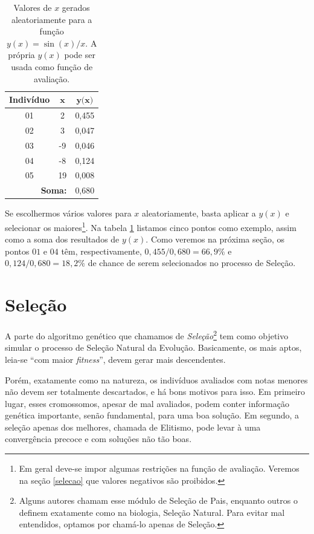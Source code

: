 	
	\begin{table}[htp]		
		\caption{\label{tabSen}Valores de $x$ gerados aleatoriamente para a função $y(x) = \sin(x)/x$. A própria $y(x)$ pode ser usada como função de avaliação.}
		\begin{center}
			\begin{tabular}{ccc}
				\hline
				\textbf{Indivíduo}& $\textbf{x}$		& $\textbf{y(x)}$ \\
				\hline
				01 & 	2							& 0,455 \\
				02 & 	3							& 0,047 \\
				03 &	-9						& 0,046\\	
				04 &	-8							& 0,124 \\
				05 &	19							& 	0,008 \\
				\hline
				\multicolumn{2}{r}{\textbf{Soma:}} & 0,680 \\
				\hline
			\end{tabular}
		\end{center}
	\end{table}
	
	
	Se escolhermos vários valores para $x$ aleatoriamente, basta aplicar a $y(x)$ e selecionar os maiores\footnote{Em geral deve-se impor algumas restrições na função de avaliação. Veremos na seção \ref{selecao} que valores negativos são proibidos.}. Na tabela \ref{tabSen} listamos cinco pontos como exemplo, assim como a soma dos resultados de $y(x)$. Como veremos na próxima seção, os pontos $01$ e $04$ têm, respectivamente, $0,455/0,680 = 66,9\%$ e $ 0,124/0,680 = 18,2\%$ de chance de serem selecionados no processo de Seleção.
	
	\section{\label{selecao}Seleção}
	
	A parte do algoritmo genético que chamamos de \textit{Seleção}\footnote{Alguns autores chamam esse módulo de Seleção de Pais, enquanto outros o definem exatamente como na biologia, Seleção Natural. Para evitar mal entendidos, optamos por chamá-lo apenas de Seleção.} tem como objetivo simular o processo de Seleção Natural da Evolução. Basicamente, os  mais aptos, leia-se ``com maior \textit{fitness}'', devem gerar mais descendentes.
	
	Porém, exatamente como na natureza, os indivíduos avaliados com notas menores não devem ser totalmente descartados, e há bons motivos para isso. Em primeiro lugar, esses cromossomos, apesar de mal avaliados, podem conter informação genética importante, senão fundamental, para uma boa solução. Em segundo, a seleção apenas dos melhores, chamada de Elitismo, pode levar à uma convergência precoce e com soluções não tão boas.
	
